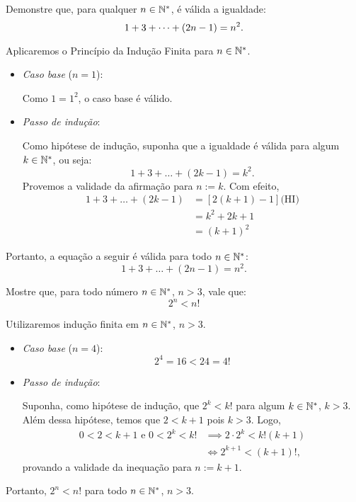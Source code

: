 \begin{example}
Demonstre que, para qualquer $n \in \mathbb{N}^*$, é válida a igualdade:
%
\begin{equation*}
1+3+\dots +\left(2n-1\right) = n^2.
\end{equation*}
\end{example}

\begin{solution}
Aplicaremos o Princípio da Indução Finita para $n \in \mathbb{N}^*$.
%
\begin{itemize}
	\item \textit{Caso base} ($n=1$):

	Como $1=1^2$, o caso base é válido.

	\item \textit{Passo de indução}:

	Como hipótese de indução, suponha que a igualdade é válida para algum $k\in \mathbb{N}^*$, ou seja:
	\begin{equation*}
	1+3+\dots+(2k-1) = k^2.
	\end{equation*}
	Provemos a validade da afirmação para $n := k$. Com efeito,
	\begin{align*}
	1+3+\dots + (2k-1) & = \left[2(k+1)-1\right] \text{(HI)} \\
	& = k^2+2k+1 \\
	& = (k+1)^2
	\end{align*}
\end{itemize}
%
Portanto, a equação a seguir é válida para todo $n \in \mathbb{N}^*$:
%
\begin{equation*}
1+3+\dots + (2n-1) = n^2.
\end{equation*}
\end{solution}

\begin{example}
Mostre que, para todo número $n \in \mathbb{N}^*$, $n>3$, vale que:
%
\begin{equation*}
2^n < n!
\end{equation*}
\end{example}

\begin{solution}
Utilizaremos indução finita em $n \in \mathbb{N}^*$, $n >3$.
%
\begin{itemize}
	\item \textit{Caso base} ($n=4$):
	\begin{equation*}
	2^4 =16 < 24=4!
	\end{equation*}  
	\item \textit{Passo de indução}:

	Suponha, como hipótese de indução, que $2^k < k!$ para algum $k \in \mathbb{N}^*$, $k>3$. Além dessa hipótese, temos que $2 < k+1$ pois $k>3$. Logo,
	\begin{align*}
	0<2<k+1 \text{ e } 0<2^k<k! & \implies 2\cdot 2^k < k!(k+1) \\
	& \iff 2^{k+1} < (k+1)!,
	\end{align*}
	provando a validade da inequação para $n:=k+1$.
\end{itemize}
%
Portanto, $2^n < n!$ para todo $n \in \mathbb{N}^*$, $n>3$.
\end{solution}

